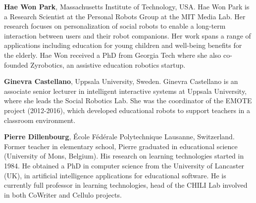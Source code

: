 \documentclass{sig-alternate-05-2015}
\begin{document}
\textbf{Hae Won Park}, Massachusetts Institute of Technology, USA. Hae Won Park is a Research Scientist at the Personal Robots Group at the MIT Media Lab. Her research focuses on personalization of social robots to enable a long-term interaction between users and their robot companions. Her work spans a range of applications including education for young children and well-being benefits for the elderly. Hae Won received a PhD from Georgia Tech where she also co-founded Zyrobotics, an assistive education robotics startup.

\textbf{Ginevra Castellano}, Uppsala University, Sweden. Ginevra Castellano is an associate senior lecturer in intelligent interactive systems at Uppsala University, where she leads the Social Robotics Lab. She was the coordinator of the EMOTE project (2012-2016), which developed educational robots to support teachers in a classroom environment.

\textbf{Pierre Dillenbourg}, École Fédérale Polytechnique Lausanne, Switzerland. Former teacher in elementary school, Pierre graduated in educational science (University of Mons, Belgium). His research on learning technologies started in 1984. He obtained a PhD in computer science from the University of Lancaster (UK), in artificial intelligence applications for educational software. He is currently full professor in learning technologies, head of the CHILI Lab involved in both CoWriter and Cellulo projects.

\end{document}
